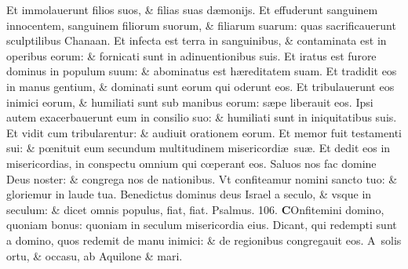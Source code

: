 \documentclass[a5paper,10pt]{book}
\def\ae{æ}
\def\oe{œ}
\begin{document}
\begin{multicols*}{2}
\newline \color{red} E\color{black}t immolauerunt filios suos, \& filias suas d\ae monijs.
\newline \color{red} E\color{black}t effuderunt sanguinem innocentem, sanguinem filiorum suorum, \& filiarum suarum: quas sacrificauerunt sculptilibus Chanaan.
\newline \color{red} E\color{black}t infecta est terra in sanguinibus, \& contaminata est in operibus eorum: \& fornicati sunt in adinuentionibus suis.
\newline \color{red} E\color{black}t iratus est furore dominus in populum suum: \& abominatus est h\ae reditatem suam.
\newline \color{red} E\color{black}t tradidit eos in manus gentium, \& dominati sunt eorum qui oderunt eos.
\newline \color{red} E\color{black}t tribulauerunt eos inimici eorum, \& humiliati sunt sub manibus eorum: s\ae pe liberauit eos.
\newline \color{red} I\color{black}psi autem exacerbauerunt eum in consilio suo: \& humiliati sunt in iniquitatibus suis.
\newline \color{red} E\color{black}t vidit cum tribularentur: \& audiuit orationem eorum.
\newline \color{red} E\color{black}t memor fuit testamenti sui: \& p\oe nituit eum secundum multitudinem misericordi\ae \ su\ae .
\newline \color{red} E\color{black}t dedit eos in misericordias, in conspectu omnium qui c\oe perant eos.
\newline \color{red} S\color{black}aluos nos fac domine Deus noster: \& congrega nos de nationibus.
\newline \color{red} V\color{black}t confiteamur nomini sancto tuo: \& gloriemur in laude tua.
\newline \color{red} B\color{black}enedictus dominus deus Israel a seculo, \& vsque in seculum: \& dicet omnis populus, fiat, fiat.
\newline \color{red} Psalmus. \hypertarget{ps106}{106.} \color{black}
\vspace{-.5em}
\lettrine[lines=2]{\bfseries \color{red} C}{}Onfitemini domino, quoniam bonus: quoniam in seculum misericordia eius.
\newline \color{red} D\color{black}icant, qui redempti sunt a domino, quos redemit de manu inimici: \& de regionibus congregauit eos.
\newline \color{red} A\color{black}\ solis ortu, \& occasu, ab Aquilone \& mari.

\end{multicols*}
\end{document}
